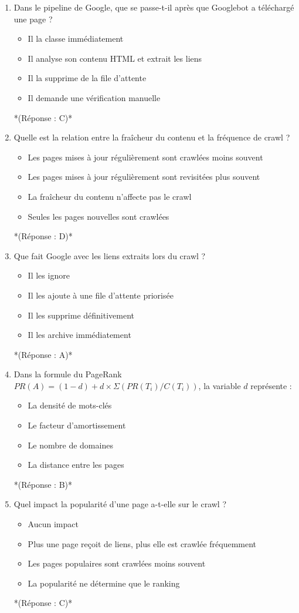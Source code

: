 \documentclass[12pt,a4paper,twoside]{report}
\begin{document}
\begin{enumerate}
\item Dans le pipeline de Google, que se passe-t-il après que Googlebot a téléchargé une page ?
\begin{itemize}
\item[A)] Il la classe immédiatement
\item[B)] Il analyse son contenu HTML et extrait les liens
\item[C)] Il la supprime de la file d'attente
\item[D)] Il demande une vérification manuelle
\end{itemize}
*(Réponse : C)*

\item Quelle est la relation entre la fraîcheur du contenu et la fréquence de crawl ?
\begin{itemize}
\item[A)] Les pages mises à jour régulièrement sont crawlées moins souvent
\item[B)] Les pages mises à jour régulièrement sont revisitées plus souvent
\item[C)] La fraîcheur du contenu n'affecte pas le crawl
\item[D)] Seules les pages nouvelles sont crawlées
\end{itemize}
*(Réponse : D)*

\item Que fait Google avec les liens extraits lors du crawl ?
\begin{itemize}
\item[A)] Il les ignore
\item[B)] Il les ajoute à une file d'attente priorisée
\item[C)] Il les supprime définitivement
\item[D)] Il les archive immédiatement
\end{itemize}
*(Réponse : A)*

\item Dans la formule du PageRank $PR(A) = (1-d) + d \times \Sigma(PR(T_i)/C(T_i))$, la variable $d$ représente :
\begin{itemize}
\item[A)] La densité de mots-clés
\item[B)] Le facteur d'amortissement
\item[C)] Le nombre de domaines
\item[D)] La distance entre les pages
\end{itemize}
*(Réponse : B)*

\item Quel impact la popularité d'une page a-t-elle sur le crawl ?
\begin{itemize}
\item[A)] Aucun impact
\item[B)] Plus une page reçoit de liens, plus elle est crawlée fréquemment
\item[C)] Les pages populaires sont crawlées moins souvent
\item[D)] La popularité ne détermine que le ranking
\end{itemize}
*(Réponse : C)*


\end{enumerate}
\end{document}
